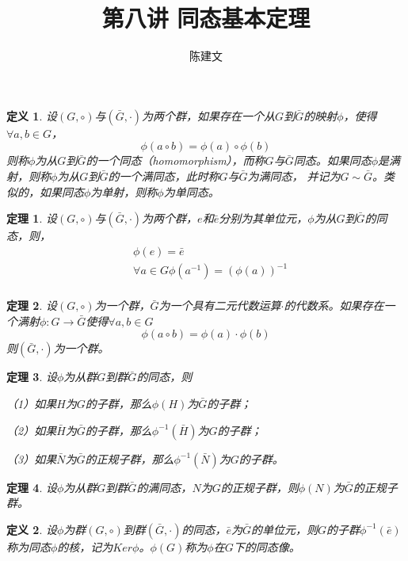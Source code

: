 \documentclass{article}
\newtheorem{Def}{定义}
\newtheorem{Thm}{定理}
\begin{document}
\begin{CJK*}{UTF8}{gbsn}
  \title{第八讲 同态基本定理}
  \author{陈建文}
  \maketitle
  

\begin{Def}
  设$(G,\circ)$与$(\bar{G},\cdot)$为两个群，如果存在一个从$G$到$\bar{G}$的映射$\phi$，使得$\forall a,b\in G$，\[\phi(a\circ b)=\phi(a)\circ \phi(b)\]
  则称$\phi$为从$G$到$\bar{G}$的一个同态（homomorphism），而称$G$与$\bar{G}$同态。如果同态$\phi$是满射，则称$\phi$为从$G$到$\bar{G}$的一个满同态，此时称$G$与$\bar{G}$为满同态，
  并记为$G\sim \bar{G}$。类似的，如果同态$\phi$为单射，则称$\phi$为单同态。
\end{Def}

\begin{Thm}
  设$(G,\circ)$与$(\bar{G},\cdot)$为两个群，$e$和$\bar{e}$分别为其单位元，$\phi$为从$G$到$\bar{G}$的同态，则，
  \begin{align*}
    &\phi(e)=\bar{e}\\
    &\forall a\in G \phi(a^{-1})=(\phi(a))^{-1}\\
  \end{align*}
\end{Thm}

\begin{Thm}
  设$(G,\circ)$为一个群，$\bar{G}$为一个具有二元代数运算$\cdot$的代数系。如果存在一个满射$\phi:G\to \bar{G}$使得$\forall a,b\in G$
  \[\phi(a\circ b)=\phi(a) \cdot \phi(b)\]
  则$(\bar{G},\cdot)$为一个群。
\end{Thm}

\begin{Thm}
  设$\phi$为从群$G$到群$\bar{G}$的同态，则

  （1）如果$H$为$G$的子群，那么$\phi(H)$为$\bar{G}$的子群；

  （2）如果$\bar{H}$为$\bar{G}$的子群，那么$\phi^{-1}(\bar{H})$为$G$的子群；

  （3）如果$\bar{N}$为$\bar{G}$的正规子群，那么$\phi^{-1}(\bar{N})$为$G$的子群。
\end{Thm}

\begin{Thm}
设$\phi$为从群$G$到群$\bar{G}$的满同态，$N$为$G$的正规子群，则$\phi(N)$为$\bar{G}$的正规子群。
\end{Thm}

\begin{Def}
设$\phi$为群$(G,\circ)$到群$(\bar{G},\cdot)$的同态，$\bar{e}$为$\bar{G}$的单位元，则$G$的子群$\phi^{-1}(\bar{e})$称为同态$\phi$的核，记为$Ker \phi$。$\phi(G)$称为$\phi$在$G$下的同态像。
\end{Def}


\end{CJK*}
\end{document}
